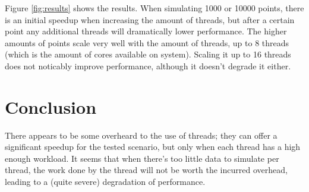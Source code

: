 \documentclass[a4paper]{article}
\begin{document}
Figure \ref{fig:results} shows the results. When simulating 1000 or 10000
points, there is an initial speedup when increasing the amount of threads, but
after a certain point any additional threads will dramatically lower
performance. The higher amounts of points scale very well with the amount of
threads, up to 8 threads (which is the amount of cores available on system).
Scaling it up to 16 threads does not noticably improve performance, although it
doesn't degrade it either. 

\section*{Conclusion}
There appears to be some overheard to the use of threads; they can offer a
significant speedup for the tested scenario, but only when each thread has a
high enough workload. It seems that when there's too little data to simulate per
thread, the work done by the thread will not be worth the incurred overhead,
leading to a (quite severe) degradation of performance.
\end{document}
